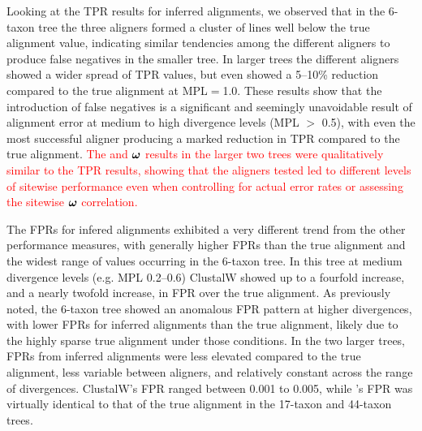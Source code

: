 \documentclass{article}
\begin{document}
Looking at the TPR results for inferred alignments, we observed that
in the 6-taxon tree the three aligners formed a cluster of lines well
below the true alignment value, indicating similar tendencies among
the different aligners to produce false negatives in the smaller
tree. In larger trees the different aligners showed a wider spread of
TPR values, but even \prankc{} showed a 5--10\% reduction compared to
the true alignment at MPL$=$1.0. These results show that the
introduction of false negatives is a significant and seemingly
unavoidable result of alignment error at medium to high divergence
levels (MPL $>$ 0.5), with even the most successful aligner producing
a marked reduction in TPR compared to the true
alignment. \textcolor{red}{The \tpr and $\bm{\omega}$ results in the larger
  two trees were qualitatively similar to the TPR results, showing
  that the aligners tested led to different levels of sitewise
  performance even when controlling for actual error rates or
  assessing the sitewise $\bm{\omega}$ correlation.}

The FPRs for infered alignments exhibited a very different trend from
the other performance measures, with generally higher FPRs than the
true alignment and the widest range of values occurring in the 6-taxon
tree. In this tree at medium divergence levels (e.g. MPL 0.2--0.6)
ClustalW showed up to a fourfold increase, and \prankc{} a nearly
twofold increase, in FPR over the true alignment. As previously noted,
the 6-taxon tree showed an anomalous FPR pattern at higher
divergences, with lower FPRs for inferred alignments than the true
alignment, likely due to the highly sparse true alignment under those
conditions. In the two larger trees, FPRs from inferred alignments
were less elevated compared to the true alignment, less variable
between aligners, and relatively constant across the range of
divergences. ClustalW's FPR ranged between 0.001 to 0.005, while
\prankc{}'s FPR was virtually identical to that of the true alignment in the
17-taxon and 44-taxon trees.
\end{document}
